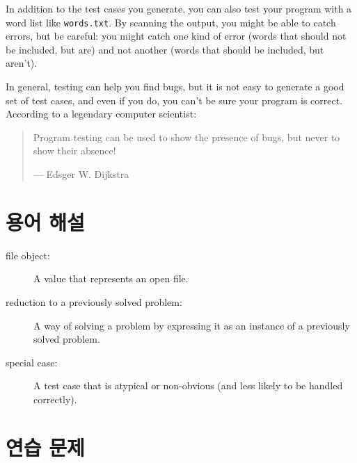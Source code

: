 \documentclass[10pt]{book}
\begin{document}
In addition to the test cases you generate, you can also test
your program with a word list like {\tt words.txt}.  By scanning
the output, you might be able to catch errors, but be careful:
you might catch one kind of error (words that should not be
included, but are) and not another (words that should be included,
but aren't).

In general, testing can help you find bugs, but it is not easy to
generate a good set of test cases, and even if you do, you can't
be sure your program is correct.
According to a legendary computer scientist:

\begin{quote}
Program testing can be used to show the presence of bugs, but never to
show their absence!

--- Edsger W. Dijkstra
\end{quote}


\section{용어 해설}

\begin{description}

\item[file object:] A value that represents an open file.

\item[reduction to a previously solved problem:] A way of solving a
  problem by expressing it as an instance of a previously solved
  problem.  

\item[special case:] A test case that is atypical or non-obvious
(and less likely to be handled correctly).

\end{description}


\section{연습 문제}
\end{document}
